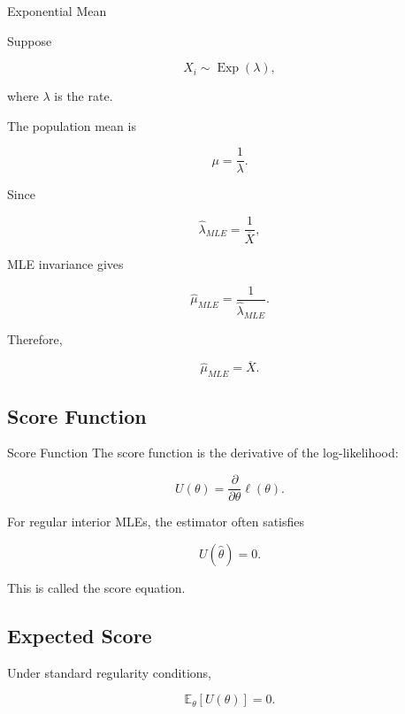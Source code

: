 \begin{workedexamplebox}{Exponential Mean}

Suppose

\[
X_i
\sim
\operatorname{Exp}(\lambda),
\]

where \(\lambda\) is the rate.

The population mean is

\[
\mu
=
\frac1\lambda.
\]

Since

\[
\widehat{\lambda}_{MLE}
=
\frac1{\overline{X}},
\]

MLE invariance gives

\[
\widehat{\mu}_{MLE}
=
\frac1{
\widehat{\lambda}_{MLE}
}.
\]

Therefore,

\begin{answerbox}
\[
\boxed{
\widehat{\mu}_{MLE}
=
\overline{X}.
}
\]
\end{answerbox}

\end{workedexamplebox}

\subsection{Score Function}
\label{subsec:score-function}

\begin{definitionbox}{Score Function}
The score function is the derivative of the log-likelihood:

\[
\boxed{
U(\theta)
=
\frac{\partial}{\partial\theta}
\ell(\theta).
}
\]
\end{definitionbox}

For regular interior MLEs, the estimator often satisfies

\[
\boxed{
U(\widehat{\theta})=0.
}
\]

This is called the score equation.

\subsection{Expected Score}
\label{subsec:expected-score}

Under standard regularity conditions,

\[
\boxed{
\mathbb{E}_\theta[U(\theta)]
=
0.
}
\]

